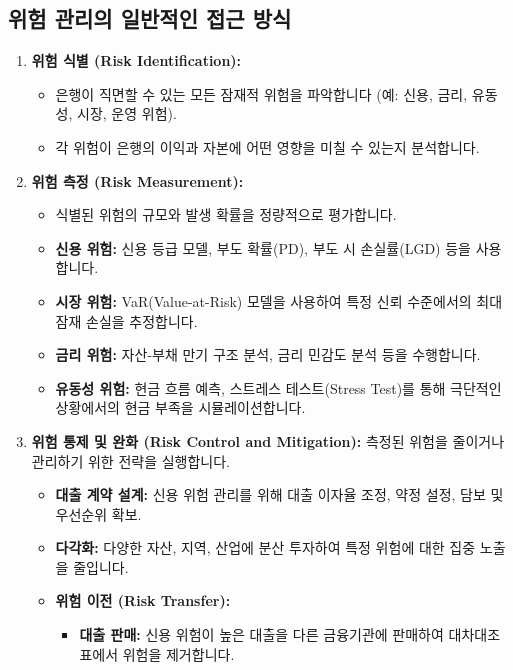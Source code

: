 \documentclass[11pt,a4paper]{article}
\begin{document}
\subsection{위험 관리의 일반적인 접근 방식}
\begin{enumerate}
    \item \textbf{위험 식별 (Risk Identification):}
        \begin{itemize}
            \item 은행이 직면할 수 있는 모든 잠재적 위험을 파악합니다 (예: 신용, 금리, 유동성, 시장, 운영 위험).
            \item 각 위험이 은행의 이익과 자본에 어떤 영향을 미칠 수 있는지 분석합니다.
        \end{itemize}
    \item \textbf{위험 측정 (Risk Measurement):}
        \begin{itemize}
            \item 식별된 위험의 규모와 발생 확률을 정량적으로 평가합니다.
            \item \textbf{신용 위험:} 신용 등급 모델, 부도 확률(PD), 부도 시 손실률(LGD) 등을 사용합니다.
            \item \textbf{시장 위험:} VaR(Value-at-Risk) 모델을 사용하여 특정 신뢰 수준에서의 최대 잠재 손실을 추정합니다.
            \item \textbf{금리 위험:} 자산-부채 만기 구조 분석, 금리 민감도 분석 등을 수행합니다.
            \item \textbf{유동성 위험:} 현금 흐름 예측, 스트레스 테스트(Stress Test)를 통해 극단적인 상황에서의 현금 부족을 시뮬레이션합니다.
        \end{itemize}
    \item \textbf{위험 통제 및 완화 (Risk Control and Mitigation):}
        측정된 위험을 줄이거나 관리하기 위한 전략을 실행합니다.
        \begin{itemize}
            \item \textbf{대출 계약 설계:} 신용 위험 관리를 위해 대출 이자율 조정, 약정 설정, 담보 및 우선순위 확보.
            \item \textbf{다각화:} 다양한 자산, 지역, 산업에 분산 투자하여 특정 위험에 대한 집중 노출을 줄입니다.
            \item \textbf{위험 이전 (Risk Transfer):}
                \begin{itemize}
                    \item \textbf{대출 판매:} 신용 위험이 높은 대출을 다른 금융기관에 판매하여 대차대조표에서 위험을 제거합니다.

\end{itemize}
\end{itemize}
\end{enumerate}
\end{document}
